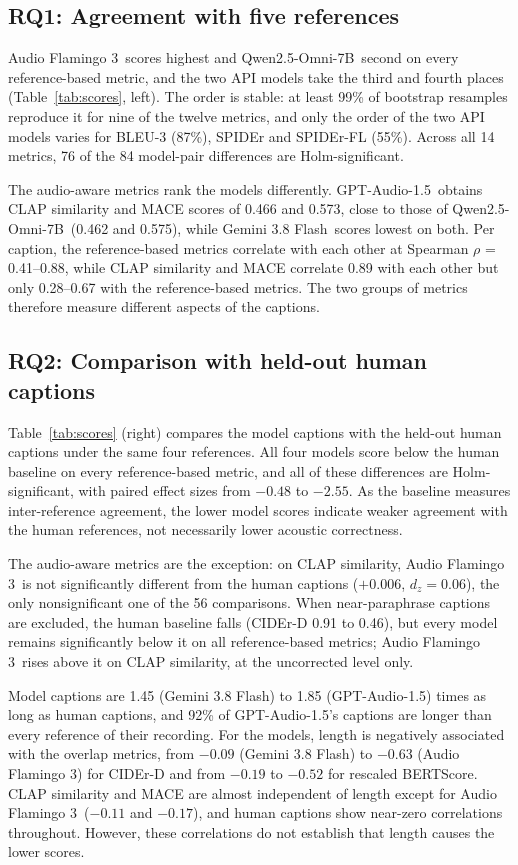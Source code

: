\documentclass{article}
\newcommand{\gpt}{GPT-Audio-1.5}
\newcommand{\gem}{Gemini 3.8 Flash}
\newcommand{\qwen}{Qwen2.5-Omni-7B}
\newcommand{\af}{Audio Flamingo 3}
\begin{document}
\subsection{RQ1: Agreement with five references}
\label{ssec:rq1}

\af\ scores highest and \qwen\ second on every reference-based metric, and the two API models take the third and
fourth places (Table~\ref{tab:scores}, left). The order is stable: at least 99\% of bootstrap resamples reproduce it for nine of
the twelve metrics, and only the order of the two API models varies for BLEU-3 (87\%), SPIDEr and SPIDEr-FL (55\%).
Across all 14 metrics, 76 of the 84 model-pair differences are Holm-significant.

The audio-aware metrics rank the models differently. \gpt\ obtains CLAP similarity and MACE scores of 0.466 and
0.573, close to those of \qwen\ (0.462 and 0.575), while \gem\ scores lowest on both. Per caption, the reference-based
metrics correlate with each other at Spearman $\rho$ = 0.41--0.88, while CLAP similarity and MACE correlate 0.89 with
each other but only 0.28--0.67 with the reference-based metrics. The two groups of metrics therefore measure different
aspects of the captions.

\subsection{RQ2: Comparison with held-out human captions}
\label{ssec:rq2}

Table~\ref{tab:scores} (right) compares the model captions with the held-out human captions under the same four
references. All four models score below the human baseline on every reference-based metric, and all of these
differences are Holm-significant, with paired effect sizes from $-0.48$ to $-2.55$. As the baseline measures
inter-reference agreement, the lower model scores indicate weaker agreement with the human references, not
necessarily lower acoustic correctness.

The audio-aware metrics are the exception: on CLAP similarity, \af\ is not significantly different from the human
captions ($+0.006$, $d_z=0.06$), the only nonsignificant one of the 56 comparisons. When near-paraphrase
captions are excluded, the human baseline falls (CIDEr-D 0.91 to 0.46), but every model remains significantly below it on all
reference-based metrics; \af\ rises above it on CLAP similarity, at the uncorrected level only.

Model captions are 1.45 (\gem) to 1.85 (\gpt) times as long as human captions, and 92\% of \gpt's captions are longer
than every reference of their recording. For the models, length is negatively associated with the overlap metrics,
from $-0.09$ (\gem) to $-0.63$ (\af) for CIDEr-D and from $-0.19$ to $-0.52$ for rescaled BERTScore. CLAP similarity
and MACE are almost independent of length except for \af\ ($-0.11$ and $-0.17$), and human captions show near-zero
correlations throughout. However, these correlations do not establish that length causes the lower scores.
\end{document}
